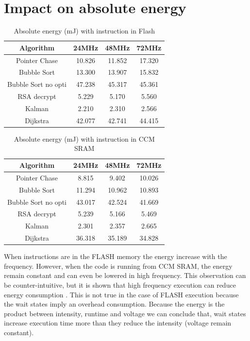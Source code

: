 \documentclass[conference]{IEEEtran}
\begin{document}
\section{Impact on absolute energy}


\begin{table}[h!]
\centering
\begin{tabular}{||c c c c||} 
 \hline
 Algorithm & 24MHz & 48MHz & 72MHz \\ [0.5ex] \hline\hline
 Pointer Chase & 10.826 & 11.852 & 17.320 \\ 
 Bubble Sort & 13.300 & 13.907 & 15.832 \\
 Bubble Sort no opti & 47.238 & 45.317 & 45.361 \\
 RSA decrypt & 5.229 & 5.170 & 5.560 \\
 Kalman & 2.210 & 2.310 & 2.566 \\
 Dijkstra & 42.077 & 42.741 & 44.415 \\[1ex] 
 \hline
\end{tabular}
\caption{Absolute energy (mJ) with instruction in Flash}
\label{energy_tab_code_flash}
\end{table}



\begin{table}[h!]
\centering
\begin{tabular}{||c c c c||} 
 \hline
 Algorithm & 24MHz & 48MHz & 72MHz \\ [0.5ex] \hline\hline
 Pointer Chase & 8.815 & 9.402 & 10.026 \\ 
 Bubble Sort & 11.294 & 10.962 & 10.893 \\
 Bubble Sort no opti & 43.017 & 42.524 & 41.669 \\
 RSA decrypt & 5.239 & 5.166 & 5.469 \\
 Kalman & 2.301 & 2.357 & 2.665 \\
 Dijkstra & 36.318 & 35.189 & 34.828 \\[1ex] 
 \hline
\end{tabular}
\caption{Absolute energy (mJ) with instruction in CCM SRAM}
\label{energy_tab_code_ccm}
\end{table}

When instructions are in the FLASH memory the energy increase with the
frequency. However, when the code is running from CCM SRAM, the energy remain
constant and can even be lowered in high frequency. This observation can be
counter-intuitive, but it is shown that high frequency execution can reduce
energy consumption \cite{pwr_clock}. This is not true in the case of FLASH
execution because the wait states imply an overhead consumption. Because the
energy is the product between intensity, runtime and voltage we can conclude
that, wait states increase execution time more than they reduce the intensity
(voltage remain constant). 
\end{document}
